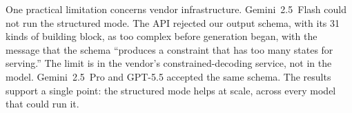 One practical limitation concerns vendor infrastructure. Gemini~2.5~Flash could not run the structured mode. The API rejected our output schema, with its 31 kinds of building block, as too complex before generation began, with the message that the schema ``produces a constraint that has too many states for serving.'' The limit is in the vendor's constrained-decoding service, not in the model. Gemini~2.5~Pro and GPT-5.5 accepted the same schema. The results support a single point: the structured mode helps at scale, across every model that could run it.

